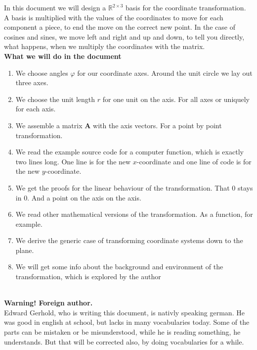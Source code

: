 \documentclass[a4paper]{article}
\begin{document}
In this document we will design a $\mathbb{R}^{2\times{3}}$ basis for the coordinate transformation. 
A basis is multiplied with the values of the coordinates to move for each component 
a piece, to end the move on the correct new point.
In the case of cosines and sines, we move left and right and up and down, to 
tell you directly, what happens, when we multiply the coordinates with the matrix.\\

\textbf{What we will do in the document}

\begin{enumerate}
\item We choose angles $\varphi$ for our coordinate axes. Around the unit circle we lay out three axes.
\item We choose the unit length $r$ for one unit on the axis. For all axes or uniquely for each axis.
\item We assemble a matrix $\boldsymbol{A}$ with the axis vectors. For a point by point transformation.
\item We read the example source code for a computer function, which is exactly two lines long. One line is for the new $x$-coordinate and one line of code is for the new $y$-coordinate.
\item We get the proofs for the linear behaviour of the transformation. That 0 stays in 0. And a point on the axis on the axis.
\item We read other mathematical versions of the transformation. As a function, for example.
\item We derive the generic case of transforming coordinate systems down to the plane.
\item We will get some info about the background and environment of the transformation, which is explored by the author
\end{enumerate}\\

\textbf{Warning! Foreign author.}\\
Edward Gerhold, who is writing this document, is nativly speaking german. He was good in english at school, but lacks in many vocabularies today. Some of the parts can be mistaken or be misunderstood, while he is reading something, he understands. But that will be corrected also, by doing vocabularies for a while.\\
\end{document}
